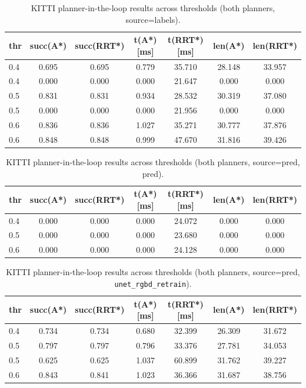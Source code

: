 

\begin{table}[H]
  \centering
  \caption{KITTI planner-in-the-loop results across thresholds (both planners, source=labels).}
  \label{tab:kitti_planner_labels}
  \begin{tabular}{lcccccc}
    \toprule
    thr & succ(A*) & succ(RRT*) & t(A*) [ms] & t(RRT*) [ms] & len(A*) & len(RRT*) \\ 
    \midrule
    0.4 & 0.695 & 0.695 & 0.779 & 35.710 & 28.148 & 33.957 \\
    0.4 & 0.000 & 0.000 & 0.000 & 21.647 & 0.000 & 0.000 \\
    0.5 & 0.831 & 0.831 & 0.934 & 28.532 & 30.319 & 37.080 \\
    0.5 & 0.000 & 0.000 & 0.000 & 21.956 & 0.000 & 0.000 \\
    0.6 & 0.836 & 0.836 & 1.027 & 35.271 & 30.777 & 37.876 \\
    0.6 & 0.848 & 0.848 & 0.999 & 47.670 & 31.816 & 39.426 \\
    \bottomrule
  \end{tabular}
\end{table}





\begin{table}[H]
  \centering
  \caption{KITTI planner-in-the-loop results across thresholds (both planners, source=pred, pred).}
  \label{tab:kitti_planner_pred_pred}
  \begin{tabular}{lcccccc}
    \toprule
    thr & succ(A*) & succ(RRT*) & t(A*) [ms] & t(RRT*) [ms] & len(A*) & len(RRT*) \\ 
    \midrule
    0.4 & 0.000 & 0.000 & 0.000 & 24.072 & 0.000 & 0.000 \\
    0.5 & 0.000 & 0.000 & 0.000 & 23.680 & 0.000 & 0.000 \\
    0.6 & 0.000 & 0.000 & 0.000 & 24.128 & 0.000 & 0.000 \\
    \bottomrule
  \end{tabular}
\end{table}





\begin{table}[H]
  \centering
  \caption{KITTI planner-in-the-loop results across thresholds (both planners, source=pred, \texttt{unet\_rgbd\_retrain}).}
  \label{tab:kitti_planner_pred_unet_rgbd_retrain}
  \begin{tabular}{lcccccc}
    \toprule
    thr & succ(A*) & succ(RRT*) & t(A*) [ms] & t(RRT*) [ms] & len(A*) & len(RRT*) \\ 
    \midrule
    0.4 & 0.734 & 0.734 & 0.680 & 32.399 & 26.309 & 31.672 \\
    0.5 & 0.797 & 0.797 & 0.796 & 33.376 & 27.781 & 34.053 \\
    0.5 & 0.625 & 0.625 & 1.037 & 60.899 & 31.762 & 39.227 \\
    0.6 & 0.843 & 0.841 & 1.023 & 36.366 & 31.687 & 38.756 \\
    \bottomrule
  \end{tabular}
\end{table}



